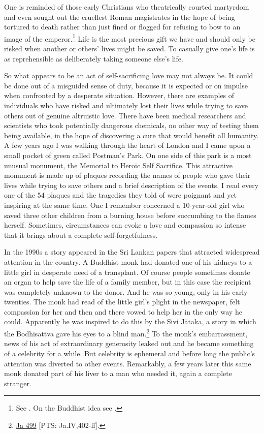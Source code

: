 \documentclass[10pt, openright]{book}
\begin{document}
One is reminded of those early Christians who theatrically courted martyrdom and even sought out the cruellest Roman magistrates in the hope of being tortured to death rather than just fined or flogged for refusing to bow to an image of the emperor.\footnote {See \cite{Droge and Tabor 1992}. On the Buddhist idea see \cite{Ohnuma 2008}.} Life is the most precious gift we have and should only be risked when another or others’ lives might be saved. To casually give one’s life is as reprehensible as deliberately taking someone else’s life.


So what appears to be an act of self-sacrificing love may not always be. It could be done out of a misguided sense of duty, because it is expected or on impulse when confronted by a desperate situation. However, there are examples of individuals who have risked and ultimately lost their lives while trying to save others out of genuine altruistic love. There have been medical researchers and scientists who took potentially dangerous chemicals, no other way of testing them being available, in the hope of discovering a cure that would benefit all humanity. A few years ago I was walking through the heart of London and I came upon a small pocket of green called Postman’s Park. On one side of this park is a most unusual monument, the Memorial to Heroic Self Sacrifice. This attractive monument is made up of plaques recording the names of people who gave their lives while trying to save others and a brief description of the events. I read every one of the 54 plaques and the tragedies they told of were poignant and yet inspiring at the same time. One I remember concerned a 10-year-old girl who saved three other children from a burning house before succumbing to the flames herself. Sometimes, circumstances can evoke a love and compassion so intense that it brings about a complete self-forgetfulness.


In the 1990s a story appeared in the Sri Lankan papers that attracted widespread attention in the country. A Buddhist monk had donated one of his kidneys to a little girl in desperate need of a transplant. Of course people sometimes donate an organ to help save the life of a family member, but in this case the recipient was completely unknown to the donor. And he was so young, only in his early twenties. The monk had read of the little girl’s plight in the newspaper, felt compassion for her and then and there vowed to help her in the only way he could. Apparently he was inspired to do this by the Sivi Jātaka, a story in which the Bodhisattva gave his eyes to a blind man.\footnote {\href{https://suttacentral.net/ja499/en/rouse}{Ja 499} [PTS: Ja.IV,402-ff].} To the monk’s embarrassment, news of his act of extraordinary generosity leaked out and he became something of a celebrity for a while. But celebrity is ephemeral and before long the public’s attention was diverted to other events. Remarkably, a few years later this same monk donated part of his liver to a man who needed it, again a complete stranger.
\end{document}
